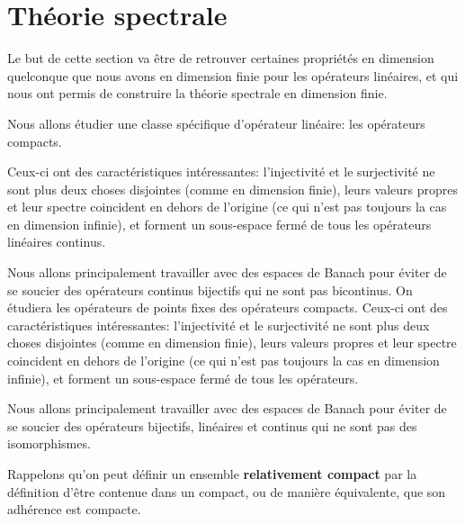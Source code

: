 \section{Théorie spectrale}

Le but de cette section va être de retrouver certaines propriétés en dimension
quelconque que nous avons en dimension finie pour les opérateurs linéaires, et
qui nous ont permis de construire la théorie spectrale en dimension finie.

Nous allons étudier une classe spécifique d'opérateur linéaire: les opérateurs
compacts.

Ceux-ci ont des caractéristiques intéressantes: l'injectivité et le surjectivité
ne sont plus deux choses disjointes (comme en dimension finie), leurs valeurs
propres et leur spectre coincident en dehors de l'origine (ce qui n'est pas
toujours la cas en dimension infinie), et forment un sous-espace fermé de tous
les opérateurs linéaires continus.

Nous allons principalement travailler avec des espaces de Banach pour éviter de
se soucier des opérateurs continus bijectifs qui ne sont pas bicontinus.
On étudiera les opérateurs de points fixes des opérateurs compacts. Ceux-ci ont
des caractéristiques intéressantes: l'injectivité et le surjectivité ne sont
plus deux choses disjointes (comme en dimension finie), leurs valeurs propres et
leur spectre coincident en dehors de l'origine (ce qui n'est pas toujours la cas
en dimension infinie), et forment un sous-espace fermé de tous les opérateurs.

Nous allons principalement travailler avec des espaces de Banach pour éviter de
se soucier des opérateurs bijectifs, linéaires et continus qui ne sont pas des
isomorphismes.




Rappelons qu'on peut définir un ensemble \textbf{relativement compact} par la
définition d'être contenue dans un compact, ou de manière équivalente, que son
adhérence est compacte.

